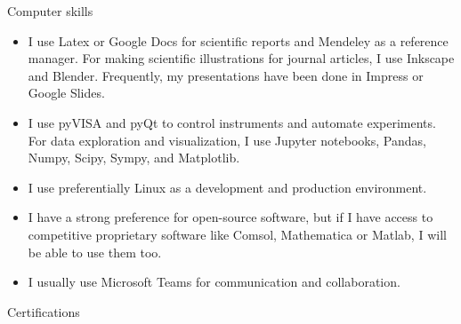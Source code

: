 \documentclass[letterpaper, 11pt]{article}[leftmargin=*]
\renewcommand{\section}[2]{
  \colorbox{boxcol}{\color{secondary}\raggedbottom\normalsize{#1}{\hspace{2pt}#2}}
}
\newcommand{\resumeItemListStart}{\begin{itemize}[leftmargin=4.5mm]\itemsep-3pt}
\newcommand{\resumeItemListEnd}{\end{itemize}}
\newcommand{\resumeItem}[1]{
  \item\small{
    {#1}
  }
}
\begin{document}
\section{\faDesktop}{Computer skills}
\resumeItemListStart
\resumeItem{\footnotesize I use Latex or Google Docs for scientific reports and Mendeley as a reference manager. For making scientific illustrations for journal articles, I use Inkscape and Blender. Frequently, my presentations have been done in Impress or Google Slides.}
\resumeItem{\footnotesize I use pyVISA and pyQt to control instruments and automate experiments. For data exploration and visualization, I use Jupyter notebooks, Pandas, Numpy, Scipy, Sympy, and Matplotlib.}
\resumeItem{\footnotesize I use preferentially Linux as a development and production environment.}
\resumeItem{\footnotesize I have a strong preference for open-source software, but if I have access to competitive proprietary software like Comsol, Mathematica or Matlab, I will be able to use them too.}
\resumeItem{\footnotesize I usually use Microsoft Teams for communication and collaboration.}
\resumeItemListEnd

\section{\faCertificate}{Certifications}
\end{document}
